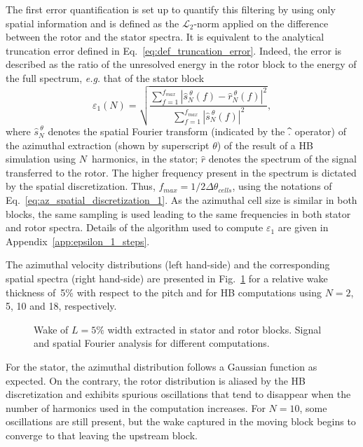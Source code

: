 The first error quantification is set up to quantify this filtering 
by using only spatial information and is defined as the $\mathcal{L}_2$-norm 
applied on the 
difference between the rotor and the stator spectra.
It is equivalent to the analytical truncation error 
defined in Eq.~\eqref{eq:def_truncation_error}. 
Indeed, the error is described as the ratio of the unresolved energy 
in the rotor block
to the energy of the full spectrum, 
\emph{e.g.} that of the stator block
\begin{equation}
    \varepsilon_1(N) = \sqrt{
    \frac{\sum_{f=1}^{f_{max}} | \widehat{s}^{~\theta}_N (f) - 
      \widehat{r}^{~\theta}_N (f)|^2}{ 
    \sum_{f=1}^{f_{max}} | \widehat{s}^{~\theta}_N (f)|^2}},
    \label{eq:def_crit_1}
\end{equation} 
where $\widehat{s}^{~\theta}_N$ denotes the spatial Fourier transform (indicated by
the $\widehat{\vphantom{s}.}$ operator) of the azimuthal extraction (shown
by superscript $\theta$) of the result of a HB simulation using $N$~harmonics,
in the stator; $\widehat{r}$ denotes the spectrum of 
the signal transferred to the rotor.
The higher frequency present in the spectrum is dictated 
by the spatial discretization. Thus, $f_{max} = 1 / 2\Delta \theta_{cells}$, 
using the notations of Eq.~\eqref{eq:az_spatial_discretization_1}.
As the azimuthal cell size is similar in both blocks, 
the same sampling is used leading to the same 
frequencies in both stator and rotor spectra.
Details of the algorithm used to compute $\varepsilon_1$ 
are given in Appendix~\ref{app:epsilon_1_steps}.

The azimuthal velocity distributions (left hand-side) and the corresponding spatial
spectra (right hand-side)
are presented in Fig.~\ref{fig:spatial_crit} 
for a relative wake thickness of~5\% with respect to the pitch 
and for HB computations using $N=2$, 5, 10 and 18, respectively.
\begin{figure}[htp]
  \centering
  \caption{Wake of $L=5\%$ width extracted in stator and rotor 
  blocks. Signal and spatial Fourier analysis for different computations.}
  \label{fig:spatial_crit}
\end{figure}
For the stator, the azimuthal distribution follows a 
Gaussian function as expected. On the contrary, 
the rotor distribution is aliased by the HB discretization 
and exhibits spurious oscillations that tend to disappear
when the number of harmonics used in the computation 
increases.
For $N=10$, some oscillations are still present, 
but the wake captured in the moving block begins to 
converge to that leaving the upstream block.

